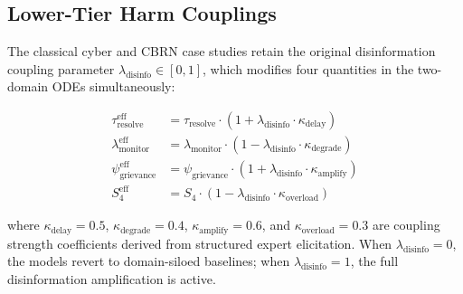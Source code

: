 \documentclass[11pt]{article}
\begin{document}
\subsection{Lower-Tier Harm Couplings}
\label{sec:disinfo_coupling}

The classical cyber and CBRN case studies retain the original disinformation coupling parameter $\lambda_{\text{disinfo}} \in [0, 1]$, which modifies four quantities in the two-domain ODEs simultaneously:

\begin{align}
\tau_{\text{resolve}}^{\text{eff}} &= \tau_{\text{resolve}} \cdot (1 + \lambda_{\text{disinfo}} \cdot \kappa_{\text{delay}}) \label{eq:disinfo1}\\
\lambda_{\text{monitor}}^{\text{eff}} &= \lambda_{\text{monitor}} \cdot (1 - \lambda_{\text{disinfo}} \cdot \kappa_{\text{degrade}}) \label{eq:disinfo2}\\
\psi_{\text{grievance}}^{\text{eff}} &= \psi_{\text{grievance}} \cdot (1 + \lambda_{\text{disinfo}} \cdot \kappa_{\text{amplify}}) \label{eq:disinfo3}\\
S_4^{\text{eff}} &= S_4 \cdot (1 - \lambda_{\text{disinfo}} \cdot \kappa_{\text{overload}}) \label{eq:disinfo4}
\end{align}

\noindent where $\kappa_{\text{delay}} = 0.5$, $\kappa_{\text{degrade}} = 0.4$, $\kappa_{\text{amplify}} = 0.6$, and $\kappa_{\text{overload}} = 0.3$ are coupling strength coefficients derived from structured expert elicitation. When $\lambda_{\text{disinfo}} = 0$, the models revert to domain-siloed baselines; when $\lambda_{\text{disinfo}} = 1$, the full disinformation amplification is active.
\end{document}
